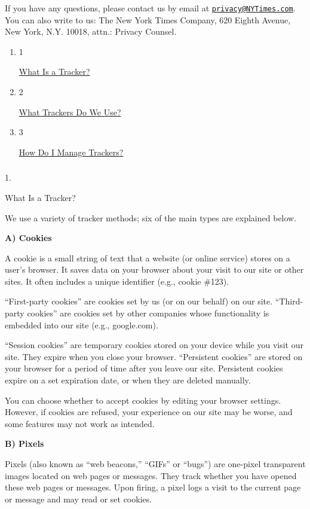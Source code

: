 If you have any questions, please contact us by email at
\href{mailto:privacy@NYTimes.com}{\nolinkurl{privacy@NYTimes.com}}. You
can also write to us: The New York Times Company, 620 Eighth Avenue, New
York, N.Y. 10018, attn.: Privacy Counsel.

\begin{enumerate}
\def\labelenumi{\arabic{enumi}.}
\item
  1

  \href{what-is-a-tracker}{What Is a Tracker?}
\item
  2

  \href{what-trackers-do-we-use}{What Trackers Do We Use?}
\item
  3

  \href{how-do-i-manage-trackers}{How Do I Manage Trackers?}
\end{enumerate}

\subsubsection{}

1.

What Is a Tracker?

We use a variety of tracker methods; six of the main types are explained
below.

\textbf{A) Cookies}

A cookie is a small string of text that a website (or online service)
stores on a user's browser. It saves data on your browser about your
visit to our site or other sites. It often includes a unique identifier
(e.g., cookie \#123).

``First-party cookies'' are cookies set by us (or on our behalf) on our
site. ``Third-party cookies'' are cookies set by other companies whose
functionality is embedded into our site (e.g., google.com).

``Session cookies'' are temporary cookies stored on your device while
you visit our site. They expire when you close your browser.
``Persistent cookies'' are stored on your browser for a period of time
after you leave our site. Persistent cookies expire on a set expiration
date, or when they are deleted manually.

You can choose whether to accept cookies by editing your browser
settings. However, if cookies are refused, your experience on our site
may be worse, and some features may not work as intended.

\textbf{B) Pixels}

Pixels (also known as ``web beacons,'' ``GIFs'' or ``bugs'') are
one-pixel transparent images located on web pages or messages. They
track whether you have opened these web pages or messages. Upon firing,
a pixel logs a visit to the current page or message and may read or set
cookies.

